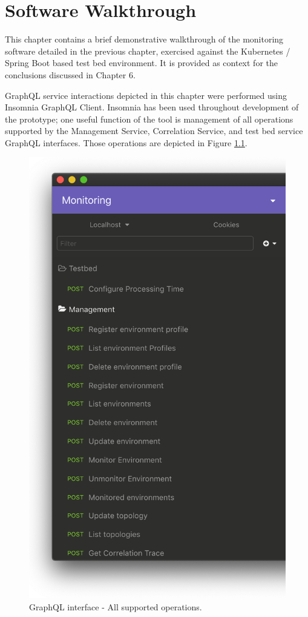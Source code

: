 \chapter{Software Walkthrough}

This chapter contains a brief demonstrative walkthrough of the monitoring software detailed in the previous chapter, exercised against the Kubernetes / Spring Boot based test bed environment. It is provided as context for the conclusions discussed in Chapter 6.

GraphQL service interactions depicted in this chapter were performed using Insomnia GraphQL Client\cite{GraphQLI51:online}. Insomnia has been used throughout development of the prototype; one useful function of the tool is management of all operations supported by the Management Service, Correlation Service, and test bed service GraphQL interfaces. Those operations are depicted in Figure \ref{walkthough_graphql_operations}.

 \begin{figure}[H]
	\centering  
	\includegraphics[scale=0.4]{figures/walkthrough/graphql_operations.png}
	\caption{GraphQL interface - All supported operations.}
	\label{walkthough_graphql_operations}
\end{figure}

